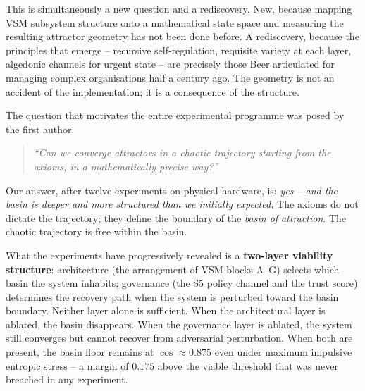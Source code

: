 \documentclass[11pt, a4paper]{article}
\begin{document}
This is simultaneously a new question and a rediscovery.
New, because mapping VSM subsystem structure onto a mathematical state
space and measuring the resulting attractor geometry has not been done
before.
A rediscovery, because the principles that emerge -- recursive
self-regulation, requisite variety at each layer, algedonic channels for
urgent state -- are precisely those Beer articulated for managing complex
organisations half a century ago.
The geometry is not an accident of the implementation; it is a consequence
of the structure.

The question that motivates the entire experimental programme was posed by
the first author:

\begin{quote}
\textit{``Can we converge attractors in a chaotic trajectory starting from
the axioms, in a mathematically precise way?''}
\end{quote}

Our answer, after twelve experiments on physical hardware, is:
\emph{yes -- and the basin is deeper and more structured than we initially
expected.}
The axioms do not dictate the trajectory; they define the boundary of the
\emph{basin of attraction}.
The chaotic trajectory is free within the basin.

What the experiments have progressively revealed is a \textbf{two-layer
viability structure}: architecture (the arrangement of VSM blocks A--G)
selects which basin the system inhabits; governance (the S5 policy channel
and the trust score) determines the recovery path when the system is
perturbed toward the basin boundary.
Neither layer alone is sufficient.
When the architectural layer is ablated, the basin disappears.
When the governance layer is ablated, the system still converges but cannot
recover from adversarial perturbation.
When both are present, the basin floor remains at $\cos \approx 0.875$
even under maximum impulsive entropic stress -- a margin of $0.175$ above
the viable threshold that was never breached in any experiment.
\end{document}
